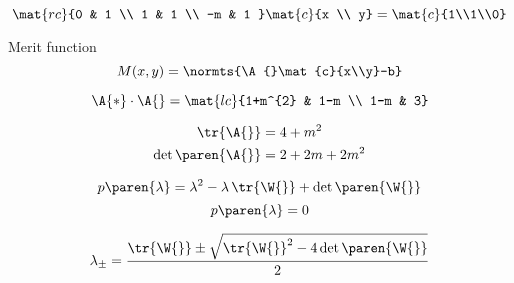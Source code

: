   \begin{equation*}   %
      \mat{rc}{0 & 1 \\ 1 & 1 \\ -m & 1 } 
      \mat{c}{x \\ y} = 
      \mat{c}{1\\1\\0}
  \end{equation*}

Merit function
  \begin{equation*}   %
      M(x,y) = \normts{\A{}\mat{c}{x\\y}-b}
  \end{equation*}

  \begin{equation*}   %
      \A{*} \cdot \A{} = 
      \mat{lc}{1+m^{2} & 1-m \\ 1-m & 3}
  \end{equation*}

  \begin{equation*}   %
    \begin{split}
      \tr {\A{}} &= 4 + m^{2} \\
      \det \paren{\A{}} &= 2 + 2m + 2m^{2}
    \end{split}
  \end{equation*}

  \begin{equation*}   %
      p\paren{\lambda} = \lambda^{2} - \lambda \, \tr{\W{}} + \det\paren{\W{}}
  \end{equation*}
  \begin{equation*}   %
      p\paren{\lambda} = 0
  \end{equation*}

  \begin{equation*}   %
      \lambda_{\pm} = \frac{\tr{\W{}} \pm \sqrt{ \tr{\W{}}^{2} - 4 \det\paren{\W{}} } } {2}
  \end{equation*}



